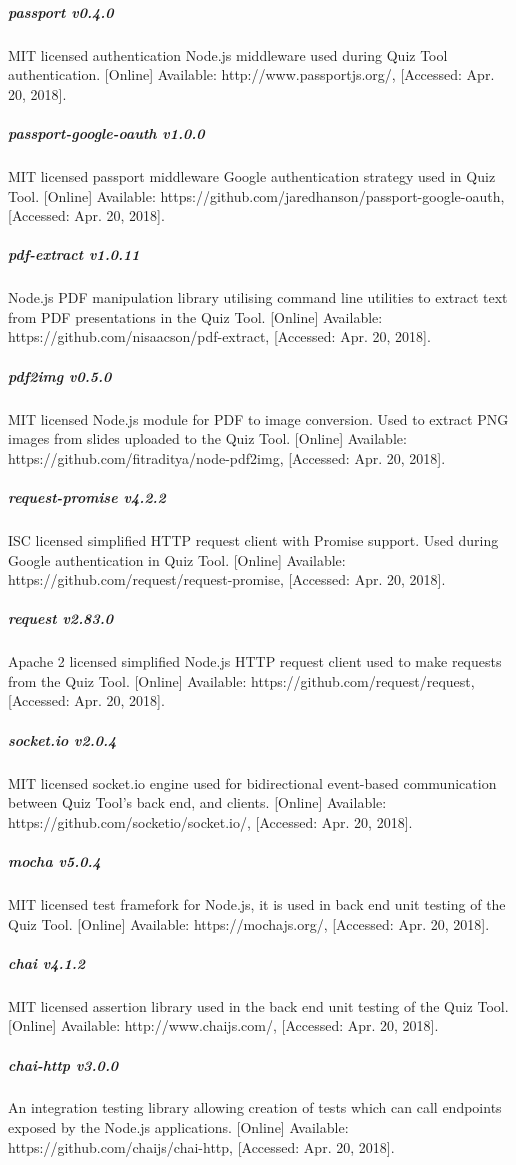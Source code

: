 \subparagraph{passport v0.4.0}
MIT licensed authentication Node.js middleware used during Quiz Tool authentication.
[Online] Available: http://www.passportjs.org/, [Accessed: Apr. 20, 2018].

\subparagraph{passport-google-oauth v1.0.0}
MIT licensed passport middleware Google authentication strategy used in Quiz Tool.
[Online] Available: https://github.com/jaredhanson/passport-google-oauth, [Accessed: Apr. 20, 2018].

\subparagraph{pdf-extract v1.0.11}
Node.js PDF manipulation library utilising command line utilities to extract text from PDF
presentations in the Quiz Tool. [Online] Available: https://github.com/nisaacson/pdf-extract, [Accessed: Apr. 20, 2018].

\subparagraph{pdf2img v0.5.0}
MIT licensed Node.js module for PDF to image conversion. Used to extract PNG images from slides uploaded
to the Quiz Tool. [Online] Available: https://github.com/fitraditya/node-pdf2img, [Accessed: Apr. 20, 2018].

\subparagraph{request-promise v4.2.2}
ISC licensed simplified HTTP request client with Promise support. Used during Google authentication in Quiz Tool.
[Online] Available: https://github.com/request/request-promise, [Accessed: Apr. 20, 2018].

\subparagraph{request v2.83.0}
Apache 2 licensed simplified Node.js HTTP request client used to make requests from the Quiz Tool.
[Online] Available: https://github.com/request/request, [Accessed: Apr. 20, 2018].

\subparagraph{socket.io v2.0.4}
MIT licensed socket.io engine used for bidirectional event-based communication between Quiz Tool's
back end, and clients. [Online] Available: https://github.com/socketio/socket.io/, [Accessed: Apr. 20, 2018].

\subparagraph{mocha v5.0.4}
MIT licensed test framefork for Node.js, it is used in back end unit testing of the Quiz Tool.
 [Online] Available: https://mochajs.org/, [Accessed: Apr. 20, 2018].

\subparagraph{chai v4.1.2}
MIT licensed assertion library used in the back end unit testing of the Quiz Tool.
 [Online] Available: http://www.chaijs.com/, [Accessed: Apr. 20, 2018].

\subparagraph{chai-http v3.0.0}
An integration testing library allowing creation of tests which can call endpoints
exposed by the Node.js applications.  [Online] Available: https://github.com/chaijs/chai-http, [Accessed: Apr. 20, 2018].

